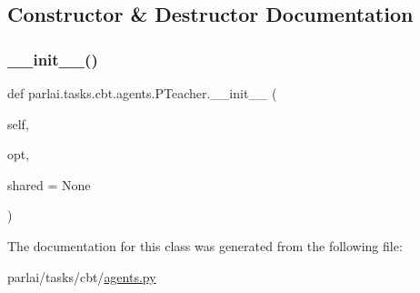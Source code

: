 \subsection{Constructor \& Destructor Documentation}
\mbox{\label{classparlai_1_1tasks_1_1cbt_1_1agents_1_1PTeacher_a8433c2ae6d5202b4646baa3db9fbeb38}} 
\subsubsection{\texorpdfstring{\+\_\+\+\_\+init\+\_\+\+\_\+()}{\_\_init\_\_()}}
{\footnotesize\ttfamily def parlai.\+tasks.\+cbt.\+agents.\+P\+Teacher.\+\_\+\+\_\+init\+\_\+\+\_\+ (\begin{DoxyParamCaption}\item[{}]{self,  }\item[{}]{opt,  }\item[{}]{shared = {\ttfamily None} }\end{DoxyParamCaption})}



The documentation for this class was generated from the following file\+:\begin{DoxyCompactItemize}
\item 
parlai/tasks/cbt/\hyperlink{parlai_2tasks_2cbt_2agents_8py}{agents.\+py}\end{DoxyCompactItemize}
